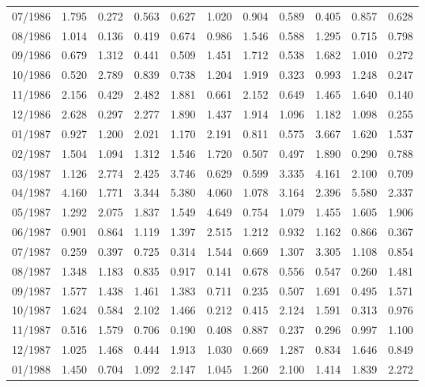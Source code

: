 \begin{tabular}{lrrrrrrrrrr}
07/1986 &  1.795 &  0.272 &  0.563 &  0.627 &  1.020 &  0.904 &  0.589 &  0.405 &  0.857 &  0.628 \\
08/1986 &  1.014 &  0.136 &  0.419 &  0.674 &  0.986 &  1.546 &  0.588 &  1.295 &  0.715 &  0.798 \\
09/1986 &  0.679 &  1.312 &  0.441 &  0.509 &  1.451 &  1.712 &  0.538 &  1.682 &  1.010 &  0.272 \\
10/1986 &  0.520 &  2.789 &  0.839 &  0.738 &  1.204 &  1.919 &  0.323 &  0.993 &  1.248 &  0.247 \\
11/1986 &  2.156 &  0.429 &  2.482 &  1.881 &  0.661 &  2.152 &  0.649 &  1.465 &  1.640 &  0.140 \\
12/1986 &  2.628 &  0.297 &  2.277 &  1.890 &  1.437 &  1.914 &  1.096 &  1.182 &  1.098 &  0.255 \\
01/1987 &  0.927 &  1.200 &  2.021 &  1.170 &  2.191 &  0.811 &  0.575 &  3.667 &  1.620 &  1.537 \\
02/1987 &  1.504 &  1.094 &  1.312 &  1.546 &  1.720 &  0.507 &  0.497 &  1.890 &  0.290 &  0.788 \\
03/1987 &  1.126 &  2.774 &  2.425 &  3.746 &  0.629 &  0.599 &  3.335 &  4.161 &  2.100 &  0.709 \\
04/1987 &  4.160 &  1.771 &  3.344 &  5.380 &  4.060 &  1.078 &  3.164 &  2.396 &  5.580 &  2.337 \\
05/1987 &  1.292 &  2.075 &  1.837 &  1.549 &  4.649 &  0.754 &  1.079 &  1.455 &  1.605 &  1.906 \\
06/1987 &  0.901 &  0.864 &  1.119 &  1.397 &  2.515 &  1.212 &  0.932 &  1.162 &  0.866 &  0.367 \\
07/1987 &  0.259 &  0.397 &  0.725 &  0.314 &  1.544 &  0.669 &  1.307 &  3.305 &  1.108 &  0.854 \\
08/1987 &  1.348 &  1.183 &  0.835 &  0.917 &  0.141 &  0.678 &  0.556 &  0.547 &  0.260 &  1.481 \\
09/1987 &  1.577 &  1.438 &  1.461 &  1.383 &  0.711 &  0.235 &  0.507 &  1.691 &  0.495 &  1.571 \\
10/1987 &  1.624 &  0.584 &  2.102 &  1.466 &  0.212 &  0.415 &  2.124 &  1.591 &  0.313 &  0.976 \\
11/1987 &  0.516 &  1.579 &  0.706 &  0.190 &  0.408 &  0.887 &  0.237 &  0.296 &  0.997 &  1.100 \\
12/1987 &  1.025 &  1.468 &  0.444 &  1.913 &  1.030 &  0.669 &  1.287 &  0.834 &  1.646 &  0.849 \\
01/1988 &  1.450 &  0.704 &  1.092 &  2.147 &  1.045 &  1.260 &  2.100 &  1.414 &  1.839 &  2.272 \\

\end{tabular}
